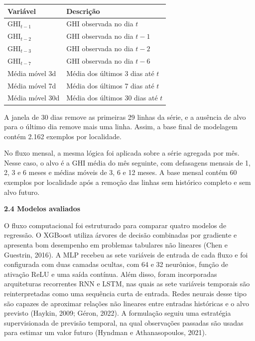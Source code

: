 \documentclass[12pt,a4paper]{article}
\begin{document}
\vspace{6pt}

\begin{center}
\begin{tabular}{ll}
\toprule
\textbf{Variável} & \textbf{Descrição} \\
\midrule
GHI$_{t-1}$ & GHI observada no dia $t$ \\
GHI$_{t-2}$ & GHI observada no dia $t-1$ \\
GHI$_{t-3}$ & GHI observada no dia $t-2$ \\
GHI$_{t-7}$ & GHI observada no dia $t-6$ \\
Média móvel 3d & Média dos últimos 3 dias até $t$ \\
Média móvel 7d & Média dos últimos 7 dias até $t$ \\
Média móvel 30d & Média dos últimos 30 dias até $t$ \\
\bottomrule
\end{tabular}
\end{center}

\vspace{6pt}

A janela de 30 dias remove as primeiras 29 linhas da série, e a ausência de alvo para o último dia remove mais uma linha. Assim, a base final de modelagem contém 2.162 exemplos por localidade.

No fluxo mensal, a mesma lógica foi aplicada sobre a série agregada por mês. Nesse caso, o alvo é a GHI média do mês seguinte, com defasagens mensais de 1, 2, 3 e 6 meses e médias móveis de 3, 6 e 12 meses. A base mensal contém 60 exemplos por localidade após a remoção das linhas sem histórico completo e sem alvo futuro.

\vspace{12pt}

\noindent\textbf{2.4 Modelos avaliados}

O fluxo computacional foi estruturado para comparar quatro modelos de regressão. O XGBoost utiliza árvores de decisão combinadas por gradiente e apresenta bom desempenho em problemas tabulares não lineares (Chen e Guestrin, 2016). A MLP recebeu as sete variáveis de entrada de cada fluxo e foi configurada com duas camadas ocultas, com 64 e 32 neurônios, função de ativação ReLU e uma saída contínua. Além disso, foram incorporadas arquiteturas recorrentes RNN e LSTM, nas quais as sete variáveis temporais são reinterpretadas como uma sequência curta de entrada. Redes neurais desse tipo são capazes de aproximar relações não lineares entre entradas históricas e o alvo previsto (Haykin, 2009; Géron, 2022). A formulação seguiu uma estratégia supervisionada de previsão temporal, na qual observações passadas são usadas para estimar um valor futuro (Hyndman e Athanasopoulos, 2021).
\end{document}
